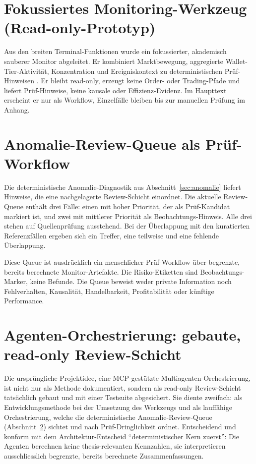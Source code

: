\section{Fokussiertes Monitoring-Werkzeug (Read-only-Prototyp)}
\label{sec:loesung-monitor}
Aus den breiten Terminal-Funktionen wurde ein fokussierter, akademisch sauberer
Monitor abgeleitet. Er kombiniert Marktbewegung, aggregierte Wallet-Tier-Aktivität,
Konzentration und Ereigniskontext zu deterministischen Prüf-Hinweisen
\citep{zotero_poly_006,zotero_poly_009}. Er bleibt read-only, erzeugt keine
Order- oder Trading-Pfade und liefert Prüf-Hinweise, keine kausale oder
Effizienz-Evidenz. Im Haupttext erscheint er nur als Workflow, Einzelfälle bleiben
bis zur manuellen Prüfung im Anhang.

\section{Anomalie-Review-Queue als Prüf-Workflow}
\label{sec:loesung-queue}
Die deterministische Anomalie-Diagnostik aus Abschnitt~\ref{sec:anomalie} liefert
Hinweise, die eine nachgelagerte Review-Schicht einordnet. Die aktuelle
Review-Queue enthält drei Fälle: einen mit hoher Priorität, der als Prüf-Kandidat
markiert ist, und zwei mit mittlerer Priorität als Beobachtungs-Hinweis. Alle drei
stehen auf Quellenprüfung ausstehend. Bei der Überlappung mit den kuratierten
Referenzfällen ergeben sich ein Treffer, eine teilweise und eine fehlende
Überlappung.

Diese Queue ist ausdrücklich ein menschlicher Prüf-Workflow über begrenzte, bereits
berechnete Monitor-Artefakte. Die Risiko-Etiketten sind Beobachtungs-Marker, keine
Befunde. Die Queue beweist weder private Information noch Fehlverhalten,
Kausalität, Handelbarkeit, Profitabilität oder künftige Performance.

\section{Agenten-Orchestrierung: gebaute, read-only Review-Schicht}
\label{sec:loesung-agenten}
Die ursprüngliche Projektidee, eine MCP-gestützte Multiagenten-Orchestrierung, ist nicht nur als Methode dokumentiert, sondern als read-only Review-Schicht
tatsächlich gebaut und mit einer Testsuite abgesichert. Sie diente zweifach: als
Entwicklungsmethode bei der Umsetzung des Werkzeugs und als lauffähige
Orchestrierung, welche die deterministische Anomalie-Review-Queue
(Abschnitt~\ref{sec:loesung-queue}) sichtet und nach Prüf-Dringlichkeit ordnet.
Entscheidend und konform mit dem Architektur-Entscheid ``deterministischer Kern
zuerst'': Die Agenten berechnen keine thesis-relevanten Kennzahlen, sie
interpretieren ausschliesslich begrenzte, bereits berechnete Zusammenfassungen.


